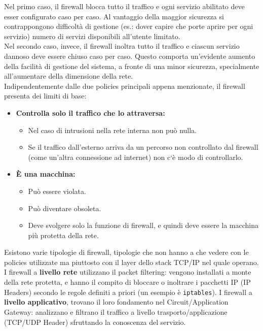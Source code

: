 \documentclass[a4paper]{report}
\begin{document}
Nel primo caso, il firewall blocca tutto il traffico e ogni servizio abilitato deve esser configurato caso per caso. Al vantaggio della maggior sicurezza si contrappongono difficoltà di gestione (es.: dover capire che porte aprire per ogni servizio) numero di servizi disponibili all'utente limitato.\\
Nel secondo caso, invece, il firewall inoltra tutto il traffico e ciascun servizio dannoso deve essere chiuso caso per caso. Questo comporta un'evidente aumento della facilità di gestione del sistema, a fronte di una minor sicurezza, specialmente all'aumentare della dimensione della rete.\\
Indipendentemente dalle due policies principali appena menzionate, il firewall presenta dei limiti di base:
\begin{itemize}
\item \textbf{Controlla solo il traffico che lo attraversa:}
	\begin{itemize}
	\item Nel caso di intrusioni nella rete interna non può nulla.
	\item Se il traffico dall'esterno arriva da un percorso non controllato dal firewall (come un'altra connessione ad internet) non c`è modo di controllarlo.
	\end{itemize}
\item \textbf{È una macchina:}
	\begin{itemize}
	\item Può essere violata.
	\item Può diventare obsoleta.
	\item Deve svolgere solo la funzione di firewall, e quindi deve essere la macchina più protetta della rete.
	\end{itemize}
\end{itemize}
Esistono varie tipologie di firewall, tipologie che non hanno a che vedere con le policies utilizzate ma piuttosto con il layer dello stack TCP/IP nel quale operano.\\
I firewall a \textbf{livello rete} utilizzano il packet filtering: vengono installati a monte della rete protetta, e hanno il compito di bloccare o inoltrare i pacchetti IP (IP Headers) secondo le regole definiti a priori (un esempio è \texttt{iptables}). I firewall a \textbf{livello applicativo}, trovano il loro fondamento nel Circuit/Application Gateway: analizzano e filtrano il traffico a livello trasporto/applicazione (TCP/UDP Header) sfruttando la conoscenza del servizio.\\
\end{document}
